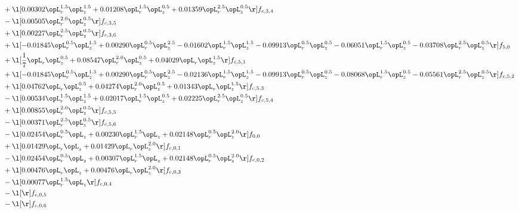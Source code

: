 \begin{alignat}{2}
& + \l[  0.00302 \opL_r^{1.5} \opL_z^{1.5} +  0.01208 \opL_r^{1.5} \opL_z^{0.5} +  0.01359 \opL_r^{2.5} \opL_z^{0.5}  \r] f_{c,3,4} \nonumber \\ 
& - \l[  0.00505 \opL_r^{2.0} \opL_z^{0.5}  \r] f_{c,3,5} \nonumber \\ 
& + \l[  0.00227 \opL_r^{2.5} \opL_z^{0.5}  \r] f_{c,3,6} \nonumber \\ 
& + \l[  -0.01845 \opL_r^{0.5} \opL_z^{1.5} +  0.00290 \opL_r^{0.5} \opL_z^{2.5}   -0.01602 \opL_r^{1.5} \opL_z^{1.5}   -0.09913 \opL_r^{0.5} \opL_z^{0.5}   -0.06051 \opL_r^{1.5} \opL_z^{0.5}   -0.03708 \opL_r^{2.5} \opL_z^{0.5}  \r] f_{5,0} \nonumber \\ 
& + \l[ \frac{1}{7} \opL_r \opL_z^{0.5} +  0.08547 \opL_r^{2.0} \opL_z^{0.5} +  0.04029 \opL_r \opL_z^{1.5}  \r] f_{c,5,1} \nonumber \\ 
& + \l[  -0.01845 \opL_r^{0.5} \opL_z^{1.5} +  0.00290 \opL_r^{0.5} \opL_z^{2.5}   -0.02136 \opL_r^{1.5} \opL_z^{1.5}   -0.09913 \opL_r^{0.5} \opL_z^{0.5}   -0.08068 \opL_r^{1.5} \opL_z^{0.5}   -0.05561 \opL_r^{2.5} \opL_z^{0.5}  \r] f_{c,5,2} \nonumber \\ 
& + \l[  0.04762 \opL_r \opL_z^{0.5} +  0.04274 \opL_r^{2.0} \opL_z^{0.5} +  0.01343 \opL_r \opL_z^{1.5}  \r] f_{c,5,3} \nonumber \\ 
& - \l[  0.00534 \opL_r^{1.5} \opL_z^{1.5} +  0.02017 \opL_r^{1.5} \opL_z^{0.5} +  0.02225 \opL_r^{2.5} \opL_z^{0.5}  \r] f_{c,5,4} \nonumber \\ 
& + \l[  0.00855 \opL_r^{2.0} \opL_z^{0.5}  \r] f_{c,5,5} \nonumber \\ 
& - \l[  0.00371 \opL_r^{2.5} \opL_z^{0.5}  \r] f_{c,5,6} \nonumber \\ 
& - \l[  0.02454 \opL_r^{0.5} \opL_z +  0.00230 \opL_r^{1.5} \opL_z +  0.02148 \opL_r^{0.5} \opL_z^{2.0}  \r] f_{0,0} \nonumber \\ 
& + \l[  0.01429 \opL_r \opL_z +  0.01429 \opL_r \opL_z^{2.0}  \r] f_{c,0,1} \nonumber \\ 
& - \l[  0.02454 \opL_r^{0.5} \opL_z +  0.00307 \opL_r^{1.5} \opL_z +  0.02148 \opL_r^{0.5} \opL_z^{2.0}  \r] f_{c,0,2} \nonumber \\ 
& + \l[  0.00476 \opL_r \opL_z +  0.00476 \opL_r \opL_z^{2.0}  \r] f_{c,0,3} \nonumber \\ 
& - \l[  0.00077 \opL_r^{1.5} \opL_z  \r] f_{c,0,4} \nonumber \\ 
& - \l[  \r] f_{c,0,5} \nonumber \\ 
& - \l[  \r] f_{c,0,6} \nonumber \\ 

\end{alignat}
